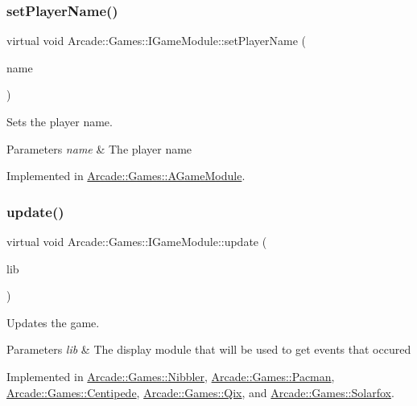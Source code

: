\subsubsection{\texorpdfstring{setPlayerName()}{setPlayerName()}}
{\footnotesize\ttfamily virtual void Arcade\+::\+Games\+::\+I\+Game\+Module\+::set\+Player\+Name (\begin{DoxyParamCaption}\item[{const std\+::string \&}]{name }\end{DoxyParamCaption})\hspace{0.3cm}{\ttfamily [pure virtual]}}



Sets the player name. 


\begin{DoxyParams}{Parameters}
{\em name} & The player name \\
\hline
\end{DoxyParams}


Implemented in \mbox{\hyperlink{classArcade_1_1Games_1_1AGameModule_abdbf4cf008033b5f339d9758d7f2b8a2}{Arcade\+::\+Games\+::\+A\+Game\+Module}}.

\mbox{\label{classArcade_1_1Games_1_1IGameModule_a421d1064fcc112dfc7ea025fc7f88aa7}} 
\subsubsection{\texorpdfstring{update()}{update()}}
{\footnotesize\ttfamily virtual void Arcade\+::\+Games\+::\+I\+Game\+Module\+::update (\begin{DoxyParamCaption}\item[{const \mbox{\hyperlink{classArcade_1_1Display_1_1IDisplayModule}{Arcade\+::\+Display\+::\+I\+Display\+Module}} \&}]{lib }\end{DoxyParamCaption})\hspace{0.3cm}{\ttfamily [pure virtual]}}



Updates the game. 


\begin{DoxyParams}{Parameters}
{\em lib} & The display module that will be used to get events that occured \\
\hline
\end{DoxyParams}


Implemented in \mbox{\hyperlink{classArcade_1_1Games_1_1Nibbler_a6a44a75ab1905647587d7a6314155955}{Arcade\+::\+Games\+::\+Nibbler}}, \mbox{\hyperlink{classArcade_1_1Games_1_1Pacman_aa6bc227c3f14cc8d66d11f2d32bed3ec}{Arcade\+::\+Games\+::\+Pacman}}, \mbox{\hyperlink{classArcade_1_1Games_1_1Centipede_a11a932a0abda301ae6037c6b97532e79}{Arcade\+::\+Games\+::\+Centipede}}, \mbox{\hyperlink{classArcade_1_1Games_1_1Qix_aab6bfb0ecf8571da19c4fcbfc9de263e}{Arcade\+::\+Games\+::\+Qix}}, and \mbox{\hyperlink{classArcade_1_1Games_1_1Solarfox_a87d7898dc7b5d8c658a18c45d35be991}{Arcade\+::\+Games\+::\+Solarfox}}.

